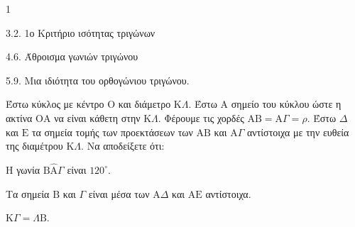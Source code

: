 \begin{ylh}{1}
    \item 3.2. 1ο Κριτήριο ισότητας τριγώνων
    \item 4.6. Άθροισμα γωνιών τριγώνου
    \item 5.9. Μια ιδιότητα του ορθογώνιου τριγώνου.
\end{ylh}
Έστω κύκλος με κέντρο $\mathrm{O}$ και διάμετρο $\mathrm{K}\Lambda$. Έστω $\mathrm{A}$ σημείο του κύκλου ώστε η ακτίνα $\mathrm{O}\mathrm{A}$ να είναι κάθετη στην $\mathrm{K}\Lambda$. Φέρουμε τις χορδές $\mathrm{A}\mathrm{B} = \mathrm{A}\Gamma = \rho$. Έστω $\Delta$ και $\mathrm{E}$ τα σημεία τομής των προεκτάσεων των $\mathrm{A}\mathrm{B}$ και $\mathrm{A}\Gamma$ αντίστοιχα με την ευθεία της διαμέτρου $\mathrm{K}\Lambda$.
Να αποδείξετε ότι:
\begin{alist}
    \item Η γωνία $\mathrm{B}\hat{\mathrm{A}}\Gamma$ είναι $120^\circ$. 
    \item Τα σημεία $\mathrm{B}$ και $\Gamma$ είναι μέσα των $\mathrm{A}\Delta$ και $\mathrm{A}\mathrm{E}$ αντίστοιχα. 
    \item $\mathrm{K}\Gamma = \Lambda\mathrm{B}$. 
\end{alist}
